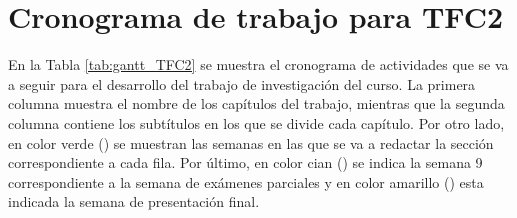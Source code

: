 \section{Cronograma de trabajo para TFC2}

En la Tabla \ref{tab:gantt_TFC2} se muestra el cronograma de actividades que se va a seguir para el desarrollo del trabajo de investigación del curso. La primera columna muestra el nombre de los capítulos del trabajo, mientras que la segunda columna contiene los subtítulos en los que se divide cada capítulo. Por otro lado, en color verde () se muestran las semanas en las que se va a redactar la sección correspondiente a cada fila. Por último, en color cian () se indica la semana 9 correspondiente a la semana de exámenes parciales y en color amarillo () esta indicada la semana de presentación final. 

